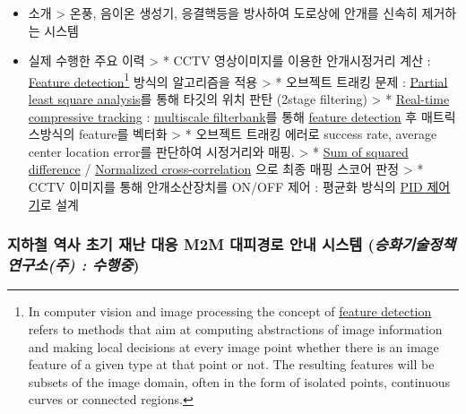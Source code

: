 \documentclass[]{article}
\begin{document}
\begin{itemize}
\item
  소개 \textgreater{} 온풍, 음이온 생성기, 응결핵등을 방사하여 도로상에
  안개를 신속히 제거하는 시스템
\item
  실제 수행한 주요 이력 \textgreater{} * CCTV 영상이미지를 이용한
  안개시정거리 계산 :
  \href{https://en.wikipedia.org/wiki/Feature_detection_(computer_vision)}{Feature
  detection}\footnote{In computer vision and image processing the
    concept of
    \href{https://en.wikipedia.org/wiki/Feature_detection_(computer_vision)}{feature
    detection} refers to methods that aim at computing abstractions of
    image information and making local decisions at every image point
    whether there is an image feature of a given type at that point or
    not. The resulting features will be subsets of the image domain,
    often in the form of isolated points, continuous curves or connected
    regions.} 방식의 알고리즘을 적용 \textgreater{} * 오브젝트 트래킹
  문제 :
  \href{https://en.wikipedia.org/wiki/Partial_least_squares_regression}{Partial
  least square analysis}를 통해 타깃의 위치 판탄 (2stage filtering)
  \textgreater{} *
  \href{http://www4.comp.polyu.edu.hk/~cslzhang/CT/CT.htm}{Real-time
  compressive tracking} :
  \href{https://en.wikipedia.org/wiki/Filter_bank}{multiscale
  filterbank}를 통해
  \href{https://en.wikipedia.org/wiki/Feature_detection_(computer_vision)}{feature
  detection} 후 매트릭스방식의 feature를 벡터화 \textgreater{} *
  오브젝트 트래킹 에러로 success rate, average center location error를
  판단하여 시정거리와 매핑. \textgreater{} *
  \href{https://siddhantahuja.wordpress.com/tag/sum-of-squared-differences/}{Sum
  of squared difference} /
  \href{https://en.wikipedia.org/wiki/Cross-correlation\#Normalized_cross-correlation}{Normalized
  cross-correlation} 으로 최종 매핑 스코어 판정 \textgreater{} * CCTV
  이미지를 통해 안개소산장치를 ON/OFF 제어 : 평균화 방식의
  \href{https://en.wikipedia.org/wiki/PID_controller}{PID 제어기}로 설계
\end{itemize}

\subsubsection{지하철 역사 초기 재난 대응 M2M 대피경로 안내 시스템 (\emph{승화기술정책연구소(주) : \textbf{수행중}})}
\end{document}
